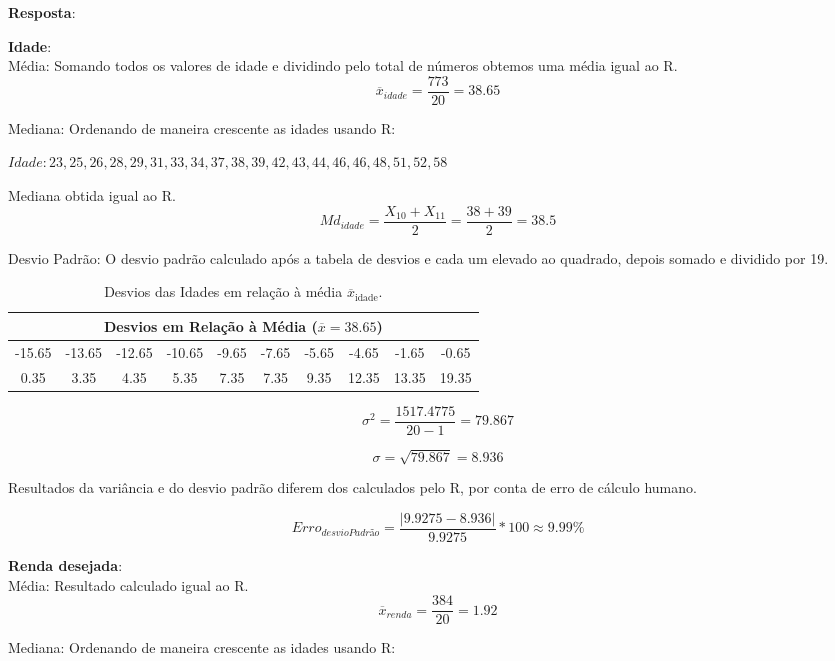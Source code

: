 \documentclass[a4paper,11pt]{article}
\begin{document}
\begin{description}[leftmargin=*]

\item[2.1] \textbf{Resposta}:

\item \textbf{Idade}: \\
Média:
Somando todos os valores de idade e dividindo pelo total de números obtemos uma média igual ao R.
\[\overline{x}_{idade} = \frac{773}{20} = 38.65\]

Mediana:
Ordenando de maneira crescente as idades usando R:

$Idade: 23, 25, 26, 28, 29, 31, 33, 34, 37, 38, 39, 42, 43, 44, 46, 46, 48, 51, 52, 58$

Mediana obtida igual ao R.
\[Md_{idade} = \frac{X_{10}+X_{11}}{2} = \frac{38+39}{2} =38.5\]


Desvio Padrão:
O desvio padrão calculado após a tabela de desvios e cada um elevado ao quadrado, depois somado e dividido por 19.
\begin{table}[H]
    \centering
    \begin{tabular}{cccccccccc}
        \hline
        \multicolumn{10}{c}{\textbf{Desvios em Relação à Média ($\overline{x} = 38.65$)}}\\
        \hline
        -15.65 & -13.65 & -12.65 & -10.65 & -9.65 & -7.65 & -5.65 & -4.65 & -1.65 & -0.65 \\ 
         0.35 & 3.35 & 4.35 & 5.35 & 7.35 & 7.35 & 9.35 & 12.35 & 13.35 & 19.35 \\
        \hline
    \end{tabular}
    \caption{Desvios das Idades em relação à média $\overline{x}_{\text{idade}}$.}
    \label{tab:desvios_idade}
\end{table}

\[\sigma^2 = \frac{ 1517.4775}{20-1} = 79.867\]

\[\sigma = \sqrt{79.867} = 8.936\]

Resultados da variância e do desvio padrão diferem dos calculados pelo R, por conta de erro de cálculo humano.

\[Erro_{desvioPadrão} = \frac{|9.9275 - 8.936|}{9.9275} * 100  \approx  9.99\%\]



\item \textbf{Renda desejada}:\\
Média:
Resultado calculado igual ao R.
\[\overline{x}_{renda} = \frac{384}{20} = 1.92\]

Mediana:
Ordenando de maneira crescente as idades usando R:


\end{description}
\end{document}
